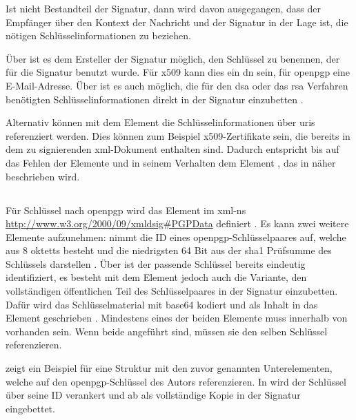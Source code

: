 Ist  nicht Bestandteil der Signatur, dann wird davon ausgegangen, dass der Empfänger über den Kontext der Nachricht und der Signatur in der
Lage ist, die nötigen Schlüsselinformationen zu beziehen.

Über  ist es dem Ersteller der Signatur möglich, den Schlüssel zu benennen, der für die Signatur benutzt wurde. Für \gls{x509} kann dies ein
\gls{dn} sein, für \gls{openpgp} eine E-Mail-Adresse. Über  ist es auch möglich, die für den \gls{dsa} oder das \gls{rsa} Verfahren
benötigten Schlüsselinformationen direkt in der Signatur einzubetten \cite{xml-dsig:w3c}.  

Alternativ können mit dem Element  die Schlüsselinformationen über \glspl{uri} referenziert werden. Dies können zum Beispiel
\gls{x509}-Zertifikate sein, die bereits in dem zu signierenden \gls{xml}-Dokument enthalten sind. Dadurch entspricht  bis auf
das Fehlen der Elemente  und  in seinem Verhalten dem Element , das in
 näher beschrieben wird.

\subsection{}
Für Schlüssel nach \gls{openpgp} wird das Element  im \gls{xml-ns} \url{http://www.w3.org/2000/09/xmldsig#PGPData}
definiert \cite{xml-sec-uri:ietf}. Es kann zwei weitere Elemente aufzunehmen:  nimmt die ID eines \gls{openpgp}-Schlüsselpaares
auf, welche aus 8 \glspl{oktett} besteht und die niedrigsten 64 Bit aus der \gls{sha1} Prüfsumme des Schlüssels darstellen \cite{openpgp:ietf}. Über 
 ist der passende Schlüssel bereits eindeutig identifiziert, es besteht mit dem Element  jedoch auch die Variante, den
vollständigen öffentlichen Teil des Schlüsselpaares in der Signatur einzubetten. Dafür wird das Schlüsselmaterial mit \gls{base64} kodiert und als Inhalt in das
Element geschrieben \cite{xml-dsig:w3c}. Mindestens eines der beiden Elemente muss innerhalb von  vorhanden sein. Wenn beide angeführt sind,
müssen sie den selben Schlüssel referenzieren.

 zeigt ein Beispiel für eine Struktur mit den zuvor genannten Unterelementen, welche auf den \gls{openpgp}-Schlüssel des Autors
referenzieren. In  wird der Schlüssel über seine ID verankert und ab  als
vollständige Kopie in der Signatur eingebettet.

